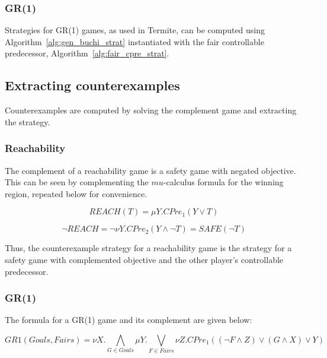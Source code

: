 \subsubsection{GR(1)}

Strategies for GR(1) games, as used in Termite, can be computed using Algorithm~\ref{alg:gen_buchi_strat} instantiated with the fair controllable predecessor, Algorithm~\ref{alg:fair_cpre_strat}.

\subsection{Extracting counterexamples}

Counterexamples are computed by solving the complement game and extracting the strategy.

\subsubsection{Reachability}

The complement of a reachability game is a safety game with negated objective. This can be seen by complementing the $mu$-calculus formula for the winning region, repeated below for convenience.

\begin{equation}
    \mathit{REACH}(T) = \mu Y. CPre_1(Y \vee T)
\end{equation}

\begin{equation}
    \neg\mathit{REACH} = \neg\nu Y. CPre_2(Y \wedge \neg T) = \mathit{SAFE}(\neg T) 
\end{equation}

Thus, the counterexample strategy for a reachability game is the strategy for a safety game with complemented objective and the other player's controllable predecessor. 

\subsubsection{GR(1)}

The formula for a GR(1) game and its complement are given below:

\begin{equation}
    GR1(Goals, Fairs) = \nu X. \bigwedge_{G \in Goals} \mu Y. \bigvee_{F \in Fairs} \nu Z. CPre_1((\neg F \wedge Z) \vee (G \wedge X) \vee Y)
\end{equation}


